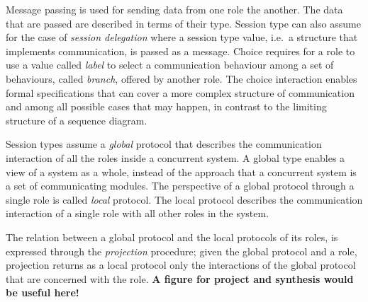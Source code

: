 Message passing is used for sending data from one role the another.
The data that are passed are described in terms of their type. Session
type can also assume for the case of {\em session delegation}
where a session type value, i.e.~a structure that implements communication,
is passed as a message.
Choice requires for a role to use a value called {\em label}
to select a communication behaviour among
a set of behaviours, called {\em branch}, offered by another role.
The choice interaction enables formal specifications that can
cover a more complex structure of communication and among all possible
cases that may happen, in contrast to the limiting structure of
a sequence diagram.

Session types assume a {\em global} protocol that describes the
communication interaction of all the roles inside a concurrent system.
A global type enables a view of a system as a whole, instead of the 
approach that a concurrent system is a set of communicating modules.
The perspective of a global protocol through a single role
is called {\em local} protocol. The local protocol describes
the communication interaction of a single role with all other roles
in the system.



The relation between a global protocol and the
local protocols of its roles, is expressed
through the {\em projection} procedure;
given the global protocol and a role, projection
returns as a local protocol only the
interactions of the global protocol that are concerned with
the role. \textbf{A figure for project and synthesis would be useful here!}

